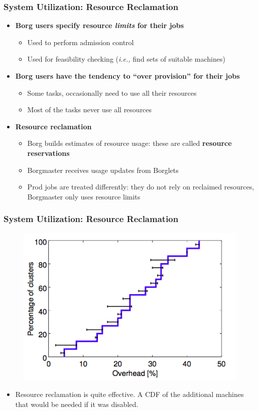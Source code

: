 \begin{frame}
\frametitle{System Utilization: Resource Reclamation}
\begin{itemize}
	\item {\bf Borg users specify resource {\it limits} for their jobs}
	\begin{itemize}
		\item Used to perform admission control
		\item Used for feasibility checking ({\it i.e.,} find sets of suitable machines)
	\end{itemize}
	\item {\bf Borg users have the tendency to ``over provision'' for their jobs}
	\begin{itemize}
		\item Some tasks, occasionally need to use all their resources
		\item Most of the tasks never use all resources
	\end{itemize}
	\item {\bf Resource reclamation}
	\begin{itemize}
		\item Borg builds estimates of resource usage: these are called {\bf resource reservations}
		\item Borgmaster receives usage updates from Borglets
		\item Prod jobs are treated differently: they do not rely on reclaimed resources, Borgmaster only uses resource limits
	\end{itemize}
\end{itemize}
\end{frame}

\begin{frame}
\frametitle{System Utilization: Resource Reclamation}
\begin{figure}[h]
  \centering
  \includegraphics[scale=0.4]{./figures/borg_exp_reclamation1}
  \label{fig:borg_exp_reclamation1}
\end{figure}
\begin{itemize}
	\item Resource reclamation is quite effective. A CDF of the additional machines that would be needed if it was disabled.
\end{itemize}
\end{frame}

